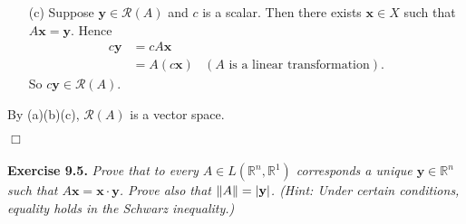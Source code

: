 \documentclass{article}
\begin{document}
\begin{enumerate}
\begin{enumerate}
  \item[(c)]
    Suppose $\mathbf{y} \in \mathscr{R}(A)$ and $c$ is a scalar.
    Then there exists $\mathbf{x} \in X$ such that $A\mathbf{x} = \mathbf{y}$.
    Hence
    \begin{align*}
      c\mathbf{y}
      &= cA\mathbf{x} \\
      &= A(c\mathbf{x})
        & (\text{$A$ is a linear transformation}).
    \end{align*}
    So $c\mathbf{y} \in \mathscr{R}(A)$.
  \end{enumerate}
  By (a)(b)(c), $\mathscr{R}(A)$ is a vector space.
\end{enumerate}
$\Box$ \\\\






\textbf{Exercise 9.5.}
\emph{Prove that to every $A \in L(\mathbb{R}^n, \mathbb{R}^1)$
corresponds a unique $\mathbf{y} \in \mathbb{R}^n$ such that
$A\mathbf{x} = \mathbf{x} \cdot \mathbf{y}$.
Prove also that $\norm{A} = |\mathbf{y}|$.
(Hint: Under certain conditions, equality holds in the Schwarz inequality.)} \\
\end{document}
